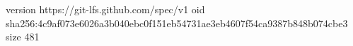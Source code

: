 version https://git-lfs.github.com/spec/v1
oid sha256:4c9af073e6026a3b040ebc0f151eb54731ae3eb4607f54ca9387b848b074cbe3
size 481
